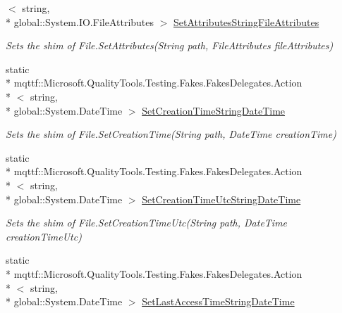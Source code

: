 \begin{DoxyCompactItemize}
$<$ string, \\*
global\-::\-System.\-I\-O.\-File\-Attributes $>$ \hyperlink{class_system_1_1_i_o_1_1_fakes_1_1_shim_file_a727508e1204c7f5e1042a3ef7acb5541}{Set\-Attributes\-String\-File\-Attributes}
\begin{DoxyCompactList}\small\item\em Sets the shim of File.\-Set\-Attributes(\-String path, File\-Attributes file\-Attributes)\end{DoxyCompactList}\item 
static \\*
mqttf\-::\-Microsoft.\-Quality\-Tools.\-Testing.\-Fakes.\-Fakes\-Delegates.\-Action\\*
$<$ string, \\*
global\-::\-System.\-Date\-Time $>$ \hyperlink{class_system_1_1_i_o_1_1_fakes_1_1_shim_file_ae101b5b3b0cd7120074bff9234915378}{Set\-Creation\-Time\-String\-Date\-Time}
\begin{DoxyCompactList}\small\item\em Sets the shim of File.\-Set\-Creation\-Time(\-String path, Date\-Time creation\-Time)\end{DoxyCompactList}\item 
static \\*
mqttf\-::\-Microsoft.\-Quality\-Tools.\-Testing.\-Fakes.\-Fakes\-Delegates.\-Action\\*
$<$ string, \\*
global\-::\-System.\-Date\-Time $>$ \hyperlink{class_system_1_1_i_o_1_1_fakes_1_1_shim_file_ac5516c80ba3f7ff75cb43a2bf2fdcd1d}{Set\-Creation\-Time\-Utc\-String\-Date\-Time}
\begin{DoxyCompactList}\small\item\em Sets the shim of File.\-Set\-Creation\-Time\-Utc(\-String path, Date\-Time creation\-Time\-Utc)\end{DoxyCompactList}\item 
static \\*
mqttf\-::\-Microsoft.\-Quality\-Tools.\-Testing.\-Fakes.\-Fakes\-Delegates.\-Action\\*
$<$ string, \\*
global\-::\-System.\-Date\-Time $>$ \hyperlink{class_system_1_1_i_o_1_1_fakes_1_1_shim_file_a00208fb64282781a85202d2d3b6b5db4}{Set\-Last\-Access\-Time\-String\-Date\-Time}

\end{DoxyCompactItemize}
